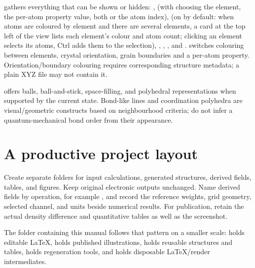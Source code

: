  gathers everything that can be shown or hidden: ,  (with  choosing the element, the per-atom property value, both or the atom index),  (on by default: when atoms are coloured by element and there are several elements, a card at the top left of the view lists each element's colour and atom count; clicking an element selects its atoms, Ctrl adds them to the selection), , , ,  and .  switches colouring between elements, crystal orientation, grain boundaries and a per-atom property. Orientation/boundary colouring requires corresponding structure metadata; a plain XYZ file may not contain it.

 offers balls, ball-and-stick, space-filling, and polyhedral representations when supported by the current state. Bond-like lines and coordination polyhedra are visual/geometric constructs based on neighbourhood criteria; do not infer a quantum-mechanical bond order from their appearance.

\section{A productive project layout}
Create separate folders for input calculations, generated structures, derived fields, tables, and figures. Keep original electronic outputs unchanged. Name derived fields by operation, for example , and record the reference weights, grid geometry, selected channel, and units beside numerical results. For publication, retain the actual density difference and quantitative tables as well as the screenshot.

The folder containing this manual follows that pattern on a smaller scale:  holds editable LaTeX,  holds published illustrations,  holds reusable structures and tables,  holds regeneration tools, and  holds disposable LaTeX/render intermediates.
